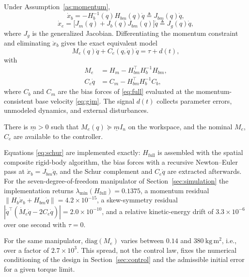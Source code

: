 Under Assumption~\ref{as:momentum},
\begin{equation}
 \dot x_b=-H_b^{-1}(q)H_{bm}(q)\dot q\triangleq J_{bm}(q)\dot q,
 \label{eq:jbm}
\end{equation}
\begin{equation}
 \dot x_e=\bigl[J_m(q)+J_b(q)J_{bm}(q)\bigr]\dot q\triangleq J_g(q)\dot q,
 \label{eq:gjm}
\end{equation}
where $J_g$ is the generalized Jacobian. Differentiating the momentum
constraint and eliminating $\ddot x_b$ gives the exact equivalent model
\begin{equation}
 M_e(q)\ddot q+C_e(q,\dot q)\dot q=\tau+d(t),
 \label{eq:reduced}
\end{equation}
with
\begin{equation}
\begin{aligned}
 M_e&=H_m-H_{bm}^\top H_b^{-1}H_{bm},\\
 C_e\dot q&=C_m-H_{bm}^\top H_b^{-1}C_b,
\end{aligned}
 \label{eq:schur}
\end{equation}
where $C_b$ and $C_m$ are the bias forces of \eqref{eq:full} evaluated at the
momentum-consistent base velocity \eqref{eq:gjm}. The signal $d(t)$ collects
parameter errors, unmodeled dynamics, and external disturbances.

\begin{assumption}\label{as:inertia}
There is $\underline m>0$ such that $M_e(q)\succeq\underline m I_n$ on the
workspace, and the nominal $M_e$, $C_e$ are available to the controller.
\end{assumption}

\begin{remark}\label{rem:implementation}
Equations \eqref{eq:schur} are implemented exactly: $H_{\mathrm{full}}$ is
assembled with the spatial composite rigid-body algorithm, the bias forces with
a recursive Newton--Euler pass at $\dot x_b=J_{bm}\dot q$, and the Schur
complement and $C_e\dot q$ are extracted afterwards. For the seven-degree-of-freedom
manipulator of Section~\ref{sec:simulation} the implementation returns
$\lambda_{\min}(H_{\mathrm{full}})=0.1375$, a momentum residual
$\|H_b\dot x_b+H_{bm}\dot q\|=4.2\times10^{-15}$, a skew-symmetry residual
$|\dot q^\top(\dot M_e\dot q-2C_e\dot q)|=2.0\times10^{-10}$, and a relative
kinetic-energy drift of $3.3\times10^{-6}$ over one second with $\tau=0$.
\end{remark}

\begin{remark}\label{rem:spread}
For the same manipulator, $\mathrm{diag}(M_e)$ varies between $0.14$ and
$380~\mathrm{kg\,m^2}$, i.e., over a factor of $2.7\times10^3$. This spread,
not the control law, fixes the numerical conditioning of the design in
Section~\ref{sec:control} and the admissible initial error for a given torque
limit.
\end{remark}
